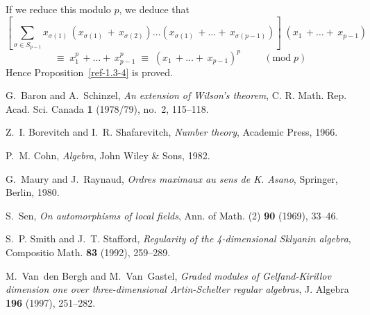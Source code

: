 \documentclass{amsart}
\numberwithin{equation}{section}
\theoremstyle{definition}
\theoremstyle{remark}
\begin{document}
If we reduce this modulo $p$, we deduce that 
\[ \left[ \sum_{\sigma \in S_{p-1}} x_{\sigma(1)} \, 
(x_{\sigma(1)} \,+\, x_{\sigma(2)}) \ldots 
(x_{\sigma(1)} \,+ \ldots +\, x_{\sigma(p-1)}) \right] \; 
(x_{1} \,+ \ldots +\, x_{p-1}) \]
\[ \equiv\; x_{1}^{p} \,+ \ldots +\, x_{p-1}^{p} \;\equiv\;
(x_{1} \,+ \ldots +\, x_{p-1})^{p} \hspace{1cm} (\mbox{mod}\;p) \]
Hence Proposition~\ref{ref-1.3-4} is proved.



%
%

\ifx\undefined\bysame
\newcommand{\bysame}{\leavevmode\hbox to3em{\hrulefill}\,}
\fi
\begin{thebibliography}{1}

G.~Baron and A.~Schinzel, {\em An extension of {W}ilson's theorem}, C. R. Math.
  Rep. Acad. Sci. Canada {\bf 1} (1978/79), no.~2, 115--118.

Z.~I. Borevitch and I.~R. Shafarevitch, {\em Number theory}, Academic Press,
  1966.

P.~M. Cohn, {\em Algebra}, John Wiley {\&} Sons, 1982.

G.~Maury and J.~Raynaud, {\em Ordres maximaux au sens de {K}. {A}sano},
  Springer, Berlin, 1980.

S.~Sen, {\em On automorphisms of local fields}, Ann. of Math. (2) {\bf 90}
  (1969), 33--46.

S.~P. Smith and J.~T. Stafford, {\em Regularity of the 4-dimensional {S}klyanin
  algebra}, Compositio Math. {\bf 83} (1992), 259--289.

M.~Van~den Bergh and M.~Van~Gastel, {\em Graded modules of {G}elfand-{K}irillov
  dimension one over three-dimensional {A}rtin-{S}chelter regular algebras}, J.
  Algebra {\bf 196} (1997), 251--282.

\end{thebibliography}


\begin{comment}
\ifx\undefined\bysame
\newcommand{\bysame}{\leavevmode\hbox to3em{\hrulefill}\,}
\fi
\begin{thebibliography}{10}

\bibitem{1}
M.~Van~den Bergh and M.~Van~Gastel, {\em Graded modules of {G}elfand-{K}irillov
  dimension one over three-dimensional {A}rtin-{S}chelter regular
algebras}, \ldots

\bibitem{2}
G.~Baron and A.~Schinzel,\ldots

\bibitem{3}
Cohn, vol3

\bibitem{4}
Shankar Sen

\bibitem{5}
Maury en Raynaud prop 2.3

\bibitem{6}
Borevitch en Safarevitch

\end{thebibliography}
\end{comment}
\end{document}
